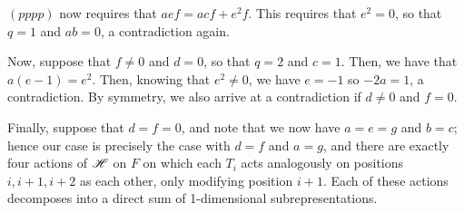 \documentclass{amsart}
\begin{document}
$(pppp)$ now requires that $aef = acf + e^2f$.
This requires that $e^2 = 0$, so that $q = 1$ and $ab = 0$, a contradiction again.

Now, suppose that $f \neq 0$ and $d = 0$, so that $q = 2$ and $c = 1$.
Then, we have that $a(e-1) = e^2$.
Then, knowing that $e^2 \neq 0$, we have $e = -1$ so $-2a = 1$, a contradiction.
By symmetry, we also arrive at a contradiction if $d \neq 0$ and $f = 0$.

Finally, suppose that $d = f = 0$, and note that we now have $a = e = g$ and $b = c$;
hence our case is precisely the case with $d = f$ and $a = g$, and there are exactly four actions of $\mathscr{H}$ on $F$ on which each $T_i$ acts analogously on positions $i,i+1,i+2$ as each other, only modifying position $i+1$. 
Each of these actions decomposes into a direct sum of 1-dimensional subrepresentations.

\iffalse

\subsection*{The Degenerate Case}
For completeness, let's actually consider the case $q = 0$;
then, as seen above, we actually require that $d = 0$, so that $a,b,c,e \in \cbr{-1,0}$. 

Then, the $(*ppp)$ braid relation we require that $ae^2 = 0$, so that at least one of $a,e$ is 0.
As far as I can tell, there are no other restrictions, so there are 12 possible ``Fibonacci'' representations for the case $q = 0$.
\fi
\end{document}
